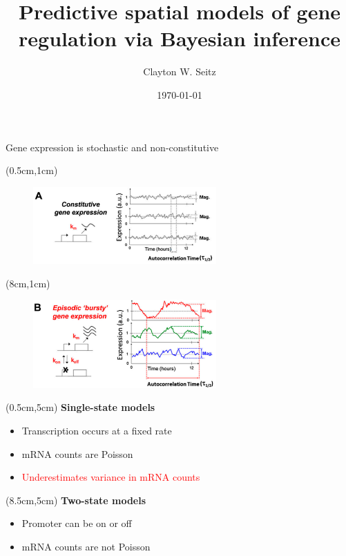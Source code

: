 \documentclass[aspectratio=1610]{beamer}					%
\title{Predictive spatial models of gene regulation via Bayesian inference}	%
\author{Clayton W. Seitz}								%
\date{\today}									%
\begin{document}
\begin{frame}
  \titlepage
\end{frame}


%

\begin{frame}{Gene expression is stochastic and non-constitutive}


\begin{textblock*}{7cm}(0.5cm,1cm)
\begin{figure}
\includegraphics[width=7cm]{burst-1.png}
\end{figure}
\end{textblock*}

\begin{textblock*}{7cm}(8cm,1cm)
\begin{figure}
\includegraphics[width=7cm]{burst-2.png}
\end{figure}
\end{textblock*}


\begin{textblock*}{15cm}(0.5cm,5cm)
\textbf{Single-state models}
\begin{itemize}
\item Transcription occurs at a fixed rate
\item mRNA counts are Poisson
\item \textcolor{red}{Underestimates variance in mRNA counts}
\end{itemize}
\end{textblock*}
\begin{textblock*}{15cm}(8.5cm,5cm)
\textbf{Two-state models}
\begin{itemize}
\item Promoter can be on or off
\item mRNA counts are not Poisson
\end{itemize}


\end{textblock*}
\end{frame}
\end{document}

